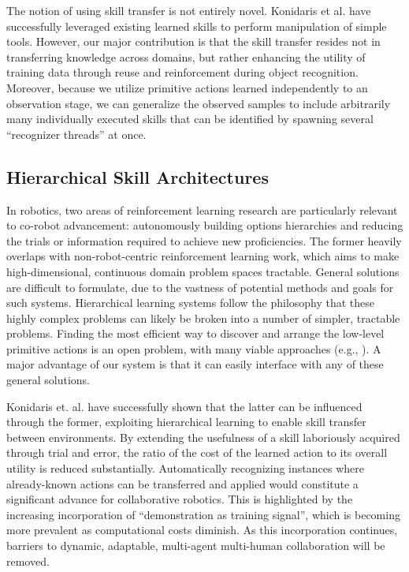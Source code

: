 \documentclass[letterpaper]{article}
\begin{document}
  The notion of using skill transfer is not entirely novel.  Konidaris et al.  have successfully leveraged existing learned skills to perform manipulation of simple tools. However, our major contribution is that the skill transfer resides not in transferring knowledge across domains, but rather enhancing the utility of training data through reuse and reinforcement during object recognition. Moreover, because we utilize primitive actions learned independently to an observation stage, we can generalize the observed samples to include arbitrarily many individually executed skills that can be identified by spawning several ``recognizer threads'' at once.


\subsection{Hierarchical Skill Architectures}
  In robotics, two areas of reinforcement learning research are particularly relevant to co-robot advancement: autonomously building options hierarchies and reducing the trials or information required to achieve new proficiencies. The former heavily overlaps with non-robot-centric reinforcement learning work, which aims to make high-dimensional, continuous domain problem spaces tractable. General solutions are difficult to formulate, due to the vastness of potential methods and goals for such systems. Hierarchical learning systems follow the philosophy that these highly complex problems can likely be broken into a number of simpler, tractable problems. Finding the most efficient way to discover and arrange the low-level primitive actions is an open problem, with many viable approaches (e.g., \citeauthor{LearningHierarchicalControl,EfficientSkillLearning,AutoHierarchyLearning}).  A major advantage of our system is that it can easily interface with any of these general solutions.

  Konidaris et. al.  have successfully shown that the latter can be influenced through the former, exploiting hierarchical learning to enable skill transfer between environments. By extending the usefulness of a skill laboriously acquired through trial and error, the ratio of the cost of the learned action to its overall utility is reduced substantially. Automatically recognizing instances where already-known actions can be transferred and applied would constitute a significant advance for collaborative robotics. This is highlighted by the increasing incorporation of ``demonstration as training signal'', which is becoming more prevalent as computational costs diminish. As this incorporation continues, barriers to dynamic, adaptable, multi-agent multi-human collaboration will be removed. 
	
\end{document}

